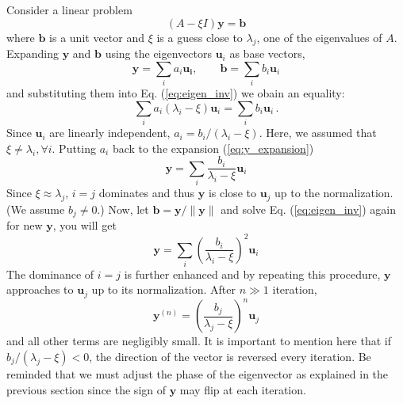 {Consider a linear problem
\begin{equation}\label{eq:eigen_inv}
(A - \xi I) \mathbf{y}=\mathbf{b}
\end{equation}
where $\mathbf{b}$ is a unit vector and $\xi$ is a guess close to $\lambda_j$, one of the eigenvalues of $A$.
Expanding $\mathbf{y}$ and $\mathbf{b}$ using the eigenvectors $\mathbf{u}_i$ as base vectors,
\begin{equation}\label{eq:y_expansion}
\mathbf{y} = \sum_i a_i \mathbf{u_i}, \qquad \mathbf{b}=\sum_i b_i \mathbf{u}_i
\end{equation}
and substituting them into Eq. (\ref{eq:eigen_inv}) we obain an equality:
\begin{equation}
\sum_i a_i (\lambda_i - \xi) \mathbf{u}_i = \sum_i b_i \mathbf{u}_i\,.
\end{equation}
Since $\mathbf{u}_i$ are linearly independent, $a_i = b_i / (\lambda_i - \xi)$.  Here, we assumed that $\xi \ne \lambda_i,  \forall i$.
Putting $a_i$ back to the expansion (\ref{eq:y_expansion})
\begin{equation}
\mathbf{y} = \sum_i \frac{b_i}{\lambda_i - \xi} \mathbf{u}_i
\end{equation}
Since $\xi \approx \lambda_j$, $i=j$ dominates and thus $\mathbf{y}$ is close to $\mathbf{u}_j$ up to the normalization. (We assume $b_j\ne 0$.) Now, let $\mathbf{b} = \mathbf{y}/\|\mathbf{y}\|$ and solve Eq. (\ref{eq:eigen_inv}) again for new $\mathbf{y}$, you will get
\begin{equation}
\mathbf{y}=\sum_i \left (\frac{b_i}{\lambda_i - \xi}\right )^2 \mathbf{u}_i
\end{equation}
The dominance of $i=j$ is further enhanced and by repeating this procedure, $\mathbf{y}$ approaches to $\mathbf{u}_j$ up to its normalization.  After $n\gg 1$ iteration,
\begin{equation}
\mathbf{y}^{(n)} = \left (\frac{b_j}{\lambda_j - \xi}\right )^n \mathbf{u}_j
\end{equation}
and all other terms are negligibly small.   It is important to mention here that if $b_j/(\lambda_j-\xi) < 0$, the direction of the vector is reversed every iteration. Be reminded that we must adjust the phase of the eigenvector as explained in the previous section since the sign of $\mathbf{y}$ may flip at each iteration.

}
